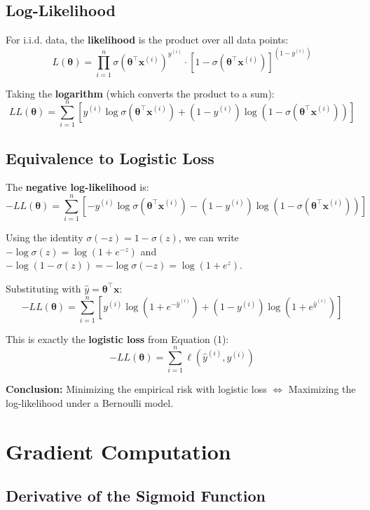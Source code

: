 \documentclass[main.tex]{subfiles}
\begin{document}
\subsection{Log-Likelihood}

For i.i.d. data, the \textbf{likelihood} is the product over all data points:
$$L(\boldsymbol{\theta}) = \prod_{i=1}^{n} \sigma(\boldsymbol{\theta}^\top \mathbf{x}^{(i)})^{y^{(i)}} \cdot [1 - \sigma(\boldsymbol{\theta}^\top \mathbf{x}^{(i)})]^{(1-y^{(i)})}$$

Taking the \textbf{logarithm} (which converts the product to a sum):
$$LL(\boldsymbol{\theta}) = \sum_{i=1}^{n} \left[ y^{(i)} \log \sigma(\boldsymbol{\theta}^\top \mathbf{x}^{(i)}) + (1 - y^{(i)}) \log(1 - \sigma(\boldsymbol{\theta}^\top \mathbf{x}^{(i)})) \right]$$

\subsection{Equivalence to Logistic Loss}

The \textbf{negative log-likelihood} is:
$$-LL(\boldsymbol{\theta}) = \sum_{i=1}^{n} \left[ -y^{(i)} \log \sigma(\boldsymbol{\theta}^\top \mathbf{x}^{(i)}) - (1 - y^{(i)}) \log(1 - \sigma(\boldsymbol{\theta}^\top \mathbf{x}^{(i)})) \right]$$

Using the identity $\sigma(-z) = 1 - \sigma(z)$, we can write $-\log \sigma(z) = \log(1 + e^{-z})$ and $-\log(1 - \sigma(z)) = -\log \sigma(-z) = \log(1 + e^{z})$.

Substituting with $\hat{y} = \boldsymbol{\theta}^\top \mathbf{x}$:
$$-LL(\boldsymbol{\theta}) = \sum_{i=1}^{n} \left[ y^{(i)} \log(1 + e^{-\hat{y}^{(i)}}) + (1 - y^{(i)}) \log(1 + e^{\hat{y}^{(i)}}) \right]$$

This is exactly the \textbf{logistic loss} from Equation (1):
$$\boxed{-LL(\boldsymbol{\theta}) = \sum_{i=1}^{n} \ell(\hat{y}^{(i)}, y^{(i)})}$$

\textbf{Conclusion:} Minimizing the empirical risk with logistic loss $\Leftrightarrow$ Maximizing the log-likelihood under a Bernoulli model.

\section{Gradient Computation}

\subsection{Derivative of the Sigmoid Function}
\end{document}

